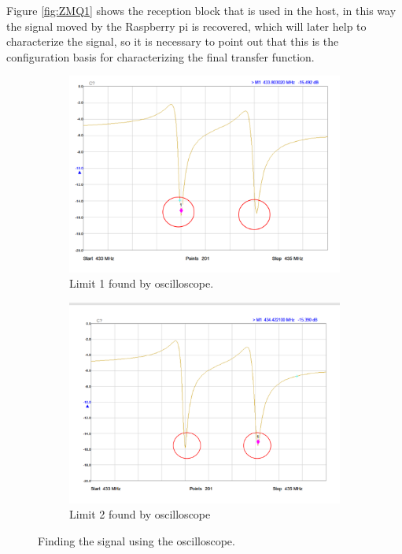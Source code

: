 \documentclass[12pt, twoside]{report}
\begin{document}
Figure \ref{fig:ZMQ1} shows the reception block that is used in the host, in this way the signal moved by the Raspberry pi is recovered, which will later help to characterize the signal, so it is necessary to point out that this is the configuration basis for characterizing the final transfer function.
\begin{figure}
     \centering
     \begin{subfigure}[b]{0.8\textwidth}
         \centering
         \includegraphics[width=\textwidth]{images/imr1.png}
         \caption{Limit 1 found by oscilloscope.}
         \label{fig:Osc1}
     \end{subfigure}
     \hfill
     \begin{subfigure}[b]{0.8\textwidth}
         \centering
         \includegraphics[width=\textwidth]{images/imr2.png}
         \caption{Limit 2 found by oscilloscope}
         \label{fig:Osc2}
     \end{subfigure}
     \hfill
        \caption{Finding the signal using the oscilloscope.}
        \label{fig:Osc}
\end{figure}
\end{document}
